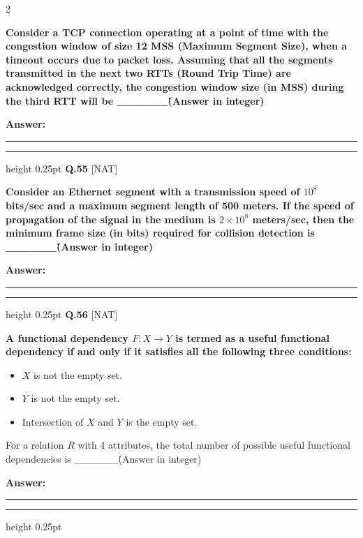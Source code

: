 \documentclass[a4paper,10pt,twoside]{article}
\begin{document}
\begin{multicols}{2}
{\bfseries Consider a TCP connection operating at a point of time with the congestion window of size 12 MSS (Maximum Segment Size), when a timeout occurs due to packet loss. Assuming that all the segments transmitted in the next two RTTs (Round Trip Time) are acknowledged correctly, the congestion window size (in MSS) during the third RTT will be \_\_\_\_\_\_\. (Answer in integer) \par}
\par\vspace{3pt}\noindent\textbf{Answer:} \rule{3.2cm}{0.4pt}
\par\vspace{6pt}\hrule height 0.25pt\vspace{6pt}
\noindent\textbf{Q.55} \hfill {\footnotesize\textsf{[NAT]}}
\par\vspace{2pt}
{\bfseries Consider an Ethernet segment with a transmission speed of $10^8$ bits/sec and a maximum segment length of 500 meters. If the speed of propagation of the signal in the medium is $2 \times 10^8$ meters/sec, then the minimum frame size (in bits) required for collision detection is \_\_\_\_\_\_\. (Answer in integer) \par}
\par\vspace{3pt}\noindent\textbf{Answer:} \rule{3.2cm}{0.4pt}
\par\vspace{6pt}\hrule height 0.25pt\vspace{6pt}
\noindent\textbf{Q.56} \hfill {\footnotesize\textsf{[NAT]}}
\par\vspace{2pt}
{\bfseries A functional dependency $F: X \to Y$ is termed as a useful functional dependency if and only if it satisfies all the following three conditions:
\begin{itemize}
\item $X$ is not the empty set.
\item $Y$ is not the empty set.
\item Intersection of $X$ and $Y$ is the empty set.
\end{itemize}
For a relation $R$ with 4 attributes, the total number of possible useful functional dependencies is \_\_\_\_\_\_\. (Answer in integer) \par}
\par\vspace{3pt}\noindent\textbf{Answer:} \rule{3.2cm}{0.4pt}
\par\vspace{6pt}\hrule height 0.25pt\vspace{6pt}

\end{multicols}
\end{document}
